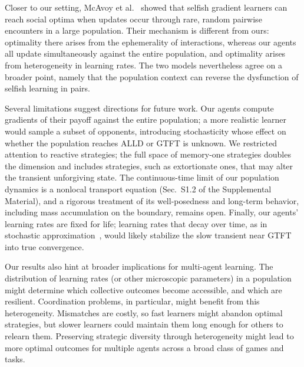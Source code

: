 \documentclass[10pt]{article}
\begin{document}
Closer to our setting, McAvoy et al.~\cite{mcavoy2022-SelfishOptimizationCollective} showed that selfish gradient learners can reach social optima when updates occur through rare, random pairwise encounters in a large population. Their mechanism is different from ours: optimality there arises from the ephemerality of interactions, whereas our agents all update simultaneously against the entire population, and optimality arises from heterogeneity in learning rates. The two models nevertheless agree on a broader point, namely that the population context can reverse the dysfunction of selfish learning in pairs.

Several limitations suggest directions for future work. Our agents compute gradients of their payoff against the entire population; a more realistic learner would sample a subset of opponents, introducing stochasticity whose effect on whether the population reaches ALLD or GTFT is unknown.
We restricted attention to reactive strategies; the full space of memory-one strategies doubles the dimension and includes strategies, such as extortionate ones, that may alter the transient unforgiving state. The continuous-time limit of our population dynamics is a nonlocal transport equation (Sec.~S1.2 of the Supplemental Material), and a rigorous treatment of its well-posedness and long-term behavior, including mass accumulation on the boundary, remains open. Finally, our agents' learning rates are fixed for life; learning rates that decay over time, as in stochastic approximation~\cite{singh2000-NashConvergenceGradient,bowling2002-MultiagentLearningUsing}, would likely stabilize the slow transient near GTFT into true convergence.

Our results also hint at broader implications for multi-agent learning.
The distribution of learning rates (or other microscopic parameters) in a population might determine which collective outcomes become accessible, and which are resilient.
Coordination problems, in particular, might benefit from this heterogeneity.
Mismatches are costly, so fast learners might abandon optimal strategies, but slower learners could maintain them long enough for others to relearn them.
Preserving strategic diversity through heterogeneity might lead to more optimal outcomes for multiple agents across a broad class of games and tasks.
\end{document}
